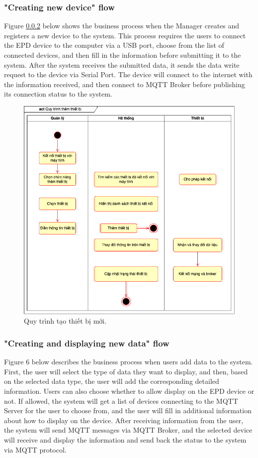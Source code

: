 \documentclass[../Main.tex]{subfiles}
\begin{document}
\subsubsection{"Creating new device" flow}
Figure \ref{} below shows the business process when the Manager creates and registers a new device to the system. This process requires the users to connect the EPD device to the computer via a USB port, choose from the list of connected devices, and then fill in the information before submitting it to the system. After the system receives the submitted data, it sends the data write request to the device via Serial Port. The device will connect to the internet with the information received, and then connect to MQTT Broker before publishing its connection status to the system.

\begin{figure}[H]
    \centering
    \includegraphics[scale=0.6]{doc/thesis/EN/imgs/act_new-device.png}
    \caption{Quy trình tạo thiết bị mới.}
    \label{fig:uc-general}
\end{figure}
\subsubsection{"Creating and displaying new data" flow}
Figure 6 below describes the business process when users add data to the system. First, the user will select the type of data they want to display, and then, based on the selected data type, the user will add the corresponding detailed information. Users can also choose whether to allow display on the EPD device or not. If allowed, the system will get a list of devices connecting to the MQTT Server for the user to choose from, and the user will fill in additional information about how to display on the device. After receiving information from the user, the system will send MQTT messages via MQTT Broker, and the selected device will receive and display the information and send back the status to the system via MQTT protocol.
\end{document}
